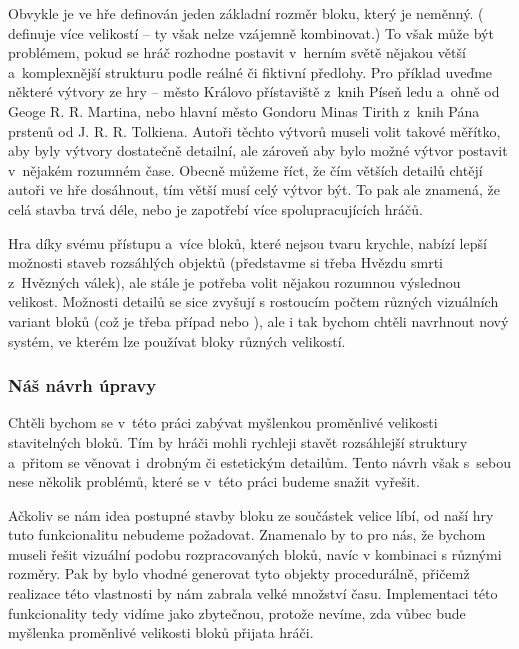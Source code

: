 Obvykle je ve hře definován jeden základní rozměr bloku, který je neměnný. (\SE{} definuje více velikostí -- ty však nelze vzájemně kombinovat.) To však může být problémem, pokud se hráč rozhodne postavit v~herním světě nějakou větší a~komplexnější strukturu podle reálné či fiktivní předlohy. Pro příklad uveďme některé výtvory ze hry \MC{} -- město Královo přístaviště z~knih Píseň ledu a~ohně od Geoge R. R. Martina, nebo hlavní město Gondoru Minas Tirith z~knih Pána prstenů od J. R. R. Tolkiena. Autoři těchto výtvorů museli volit takové měřítko, aby byly výtvory dostatečně detailní, ale zároveň aby bylo možné výtvor postavit v~nějakém rozumném čase. Obecně můžeme říct, že čím větších detailů chtějí autoři ve hře \MC{} dosáhnout, tím větší musí celý výtvor být. To pak ale znamená, že celá stavba trvá déle, nebo je zapotřebí více spolupracujících hráčů. 

Hra \SE{} díky svému přístupu a~více bloků, které nejsou tvaru krychle, nabízí lepší možnosti staveb rozsáhlých objektů (představme si třeba Hvězdu smrti z~Hvězných válek), ale stále je potřeba volit nějakou rozumnou výslednou velikost. Možnosti detailů se sice zvyšují s rostoucím počtem různých vizuálních variant bloků (což je třeba případ \SE{} nebo \NI{}), ale i tak bychom chtěli navrhnout nový systém, ve kterém lze používat bloky různých velikostí.


\subsubsection{Náš návrh úpravy}
Chtěli bychom se v~této práci zabývat myšlenkou proměnlivé velikosti stavitelných bloků. Tím by hráči mohli rychleji stavět rozsáhlejší struktury a~přitom se věnovat i~drobným či estetickým detailům. Tento návrh však s~sebou nese několik problémů, které se v~této práci budeme snažit vyřešit.

Ačkoliv se nám idea postupné stavby bloku ze součástek velice líbí, od naší hry tuto funkcionalitu nebudeme požadovat. Znamenalo by to pro nás, že bychom museli řešit vizuální podobu rozpracovaných bloků, navíc v kombinaci s různými rozměry. Pak by bylo vhodné generovat tyto objekty procedurálně, přičemž realizace této vlastnosti by nám zabrala velké množství času. Implementaci této funkcionality tedy vidíme jako zbytečnou, protože nevíme, zda vůbec bude myšlenka proměnlivé velikosti bloků přijata hráči.


